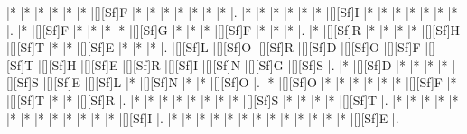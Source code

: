 \documentclass[letterpaper]{article}
\begin{document}
\vspace*{1em}
\begin{Puzzle}{13}{9}
|*        |*        |*        |*        |*        |*        |[][Sf]F  |*        |*        |*        |*        |*        |*        |*        |.
|*        |*        |*        |*        |*        |*        |[][Sf]I  |*        |*        |*        |*        |*        |*        |*        |.
|*        |[][Sf]F  |*        |*        |*        |*        |[][Sf]G  |*        |*        |*        |[][Sf]F  |*        |*        |*        |.
|*        |[][Sf]R  |*        |*        |*        |*        |[][Sf]H  |[][Sf]T  |*        |*        |[][Sf]E  |*        |*        |*        |.
|[][Sf]L  |[][Sf]O  |[][Sf]R  |[][Sf]D  |[][Sf]O  |[][Sf]F  |[][Sf]T  |[][Sf]H  |[][Sf]E  |[][Sf]R  |[][Sf]I  |[][Sf]N  |[][Sf]G  |[][Sf]S  |.
|*        |[][Sf]D  |*        |*        |*        |*        |[][Sf]S  |[][Sf]E  |[][Sf]L  |*        |[][Sf]N  |*        |*        |[][Sf]O  |.
|*        |[][Sf]O  |*        |*        |*        |*        |*        |*        |[][Sf]F  |*        |[][Sf]T  |*        |*        |[][Sf]R  |.
|*        |*        |*        |*        |*        |*        |*        |*        |[][Sf]S  |*        |*        |*        |*        |[][Sf]T  |.
|*        |*        |*        |*        |*        |*        |*        |*        |*        |*        |*        |*        |*        |[][Sf]I  |.
|*        |*        |*        |*        |*        |*        |*        |*        |*        |*        |*        |*        |*        |[][Sf]E  |.
\end{Puzzle}
\end{document}
